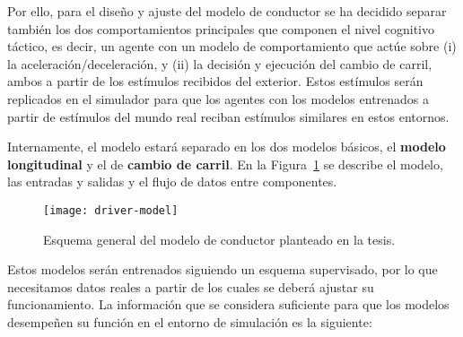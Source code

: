 Por ello, para el diseño y ajuste del modelo de conductor se ha decidido separar también los dos comportamientos principales que componen el nivel cognitivo táctico, es decir, un agente con un modelo de comportamiento que actúe sobre (i) la aceleración/deceleración, y (ii) la decisión y ejecución del cambio de carril, ambos a partir de los estímulos recibidos del exterior. Estos estímulos serán replicados en el simulador para que los agentes con los modelos entrenados a partir de estímulos del mundo real reciban estímulos similares en estos entornos.

Internamente, el modelo estará separado en los dos modelos básicos, el \textbf{modelo longitudinal} y el de \textbf{cambio de carril}. En la Figura~\ref{fig:overall-driver-model-schema} se describe el modelo, las entradas y salidas y el flujo de datos entre componentes.

\begin{figure}
	\centering
	\texttt{[image: driver-model]}
	\caption[Esquema general del modelo de conductor planteado]{Esquema general del modelo de conductor planteado en la tesis.}
	\label{fig:overall-driver-model-schema}
\end{figure}

Estos modelos serán entrenados siguiendo un esquema supervisado, por lo que necesitamos datos reales a partir de los cuales se deberá ajustar su funcionamiento. La información que se considera suficiente para que los modelos desempeñen su función en el entorno de simulación es la siguiente:

